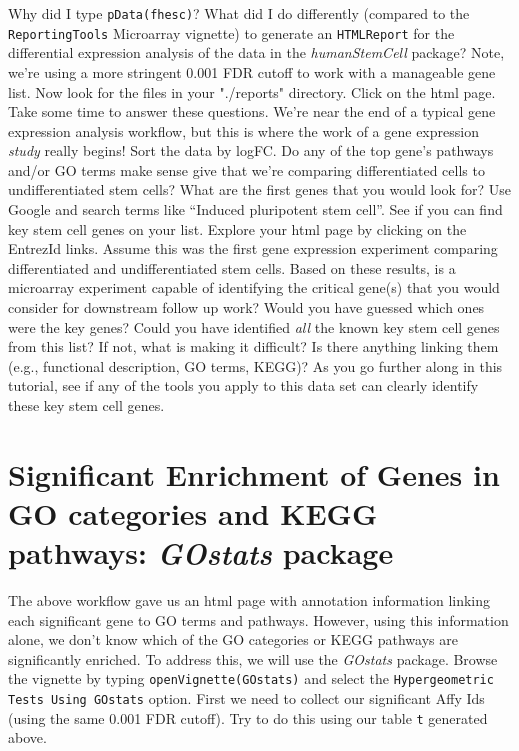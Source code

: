 \documentclass[12pt]{article}
\newcommand{\code}[1]{{\texttt{#1}}}
\begin{document}
Why did I type \code{pData(fhesc)}?  What did I do differently (compared to the \code{ReportingTools} Microarray vignette) to generate an \code{HTMLReport} for the differential expression analysis of the data in the {\it humanStemCell} package?  Note, we're using a more stringent 0.001 FDR cutoff to work with a manageable gene list.  Now look for the files in your "./reports" directory.  Click on the html page.  Take some time to answer these questions.  We're near the end of a typical gene expression analysis workflow, but this is where the work of a gene expression {\it study} really begins!  Sort the data by logFC.  Do any of the top gene's pathways and/or GO terms make sense give that we're comparing differentiated cells to undifferentiated stem cells?  What are the first genes that you would look for?  Use Google and search terms like ``Induced pluripotent stem cell''.  See if you can find key stem cell genes on your list.  Explore your html page by clicking on the EntrezId links.  Assume this was the first gene expression experiment comparing differentiated and undifferentiated stem cells.  Based on these results, is a microarray experiment capable of identifying the critical gene(s) that you would consider for downstream follow up work?  Would you have guessed which ones were the key genes?  Could you have identified {\it all} the known key stem cell genes from this list?  If not, what is making it difficult?  Is there anything linking them (e.g., functional description, GO terms, KEGG)?  As you go further along in this tutorial, see if any of the tools you apply to this data set can clearly identify these key stem cell genes.    

\section{Significant Enrichment of Genes in GO categories and KEGG pathways: {\it GOstats} package}

The above workflow gave us an html page with annotation information linking each significant gene to GO terms and pathways.  However, using this information alone, we don't know which of the GO categories or KEGG pathways are significantly enriched.  To address this, we will use the {\it GOstats} package.  Browse the vignette by typing \code{openVignette(GOstats)} and select the \code{Hypergeometric Tests Using GOstats} option.  First we need to collect our significant Affy Ids (using the same 0.001 FDR cutoff).  Try to do this using our table \code{t} generated above. 
\end{document}
